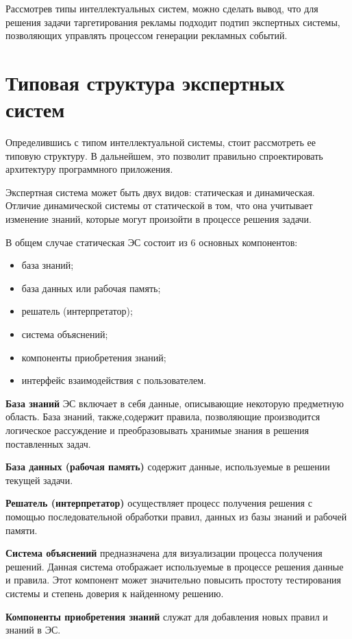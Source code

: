Рассмотрев типы интеллектуальных систем, можно сделать вывод, что для решения задачи таргетирования рекламы подходит подтип экспертных системы, позволяющих управлять процессом генерации рекламных событий.

\section{Типовая структура экспертных систем}

Определившись с типом интеллектуальной системы, стоит рассмотреть ее типовую структуру. В дальнейшем, это позволит правильно спроектировать архитектуру программного приложения.

Экспертная система может быть двух видов: статическая и динамическая. Отличие динамической системы от статической в том, что она учитывает изменение знаний, которые могут произойти в процессе решения задачи.

В общем случае статическая ЭС состоит из 6 основных компонентов:
\begin{itemize}
	\item база знаний;
	\item база данных или рабочая память;
	\item решатель (интерпретатор);
	\item система объяснений; 
	\item компоненты приобретения знаний;
	\item интерфейс взаимодействия с пользователем. 
\end{itemize}

\textbf{База знаний} ЭС включает в себя данные, описывающие некоторую предметную область. База знаний, также,содержит правила, позволяющие производится логическое рассуждение и преобразовывать хранимые знания в решения поставленных задач.

\textbf{База данных (рабочая память)} содержит данные, используемые в решении текущей задачи.

\textbf{Решатель (интерпретатор)} осуществляет процесс получения решения с помощью последовательной обработки правил, данных из базы знаний и рабочей памяти.

\textbf{Система объяснений} предназначена для визуализации процесса получения решений. Данная система отображает используемые в процессе решения данные и правила. Этот компонент может значительно повысить простоту тестирования системы и степень доверия к найденному решению.

\textbf{Компоненты приобретения знаний} служат для добавления новых правил и знаний в ЭС. 
    
